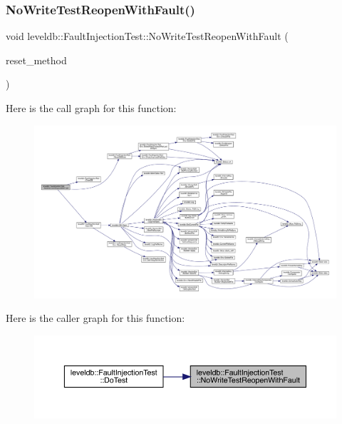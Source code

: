 \subsubsection{\texorpdfstring{NoWriteTestReopenWithFault()}{NoWriteTestReopenWithFault()}}
{\footnotesize\ttfamily void leveldb\+::\+Fault\+Injection\+Test\+::\+No\+Write\+Test\+Reopen\+With\+Fault (\begin{DoxyParamCaption}\item[{\mbox{\hyperlink{classleveldb_1_1_fault_injection_test_a316891ca042a42e0d26ec45450828cc3}{Reset\+Method}}}]{reset\+\_\+method }\end{DoxyParamCaption})\hspace{0.3cm}{\ttfamily [inline]}}

Here is the call graph for this function\+:
\nopagebreak
\begin{figure}[H]
\begin{center}
\leavevmode
\includegraphics[width=350pt]{classleveldb_1_1_fault_injection_test_a3b6eda3b745af3c89e4fe268431783ad_cgraph}
\end{center}
\end{figure}
Here is the caller graph for this function\+:
\nopagebreak
\begin{figure}[H]
\begin{center}
\leavevmode
\includegraphics[width=350pt]{classleveldb_1_1_fault_injection_test_a3b6eda3b745af3c89e4fe268431783ad_icgraph}
\end{center}
\end{figure}
\mbox{\label{classleveldb_1_1_fault_injection_test_af81cf86b19e72e08bdee141a612e6b77}} 
